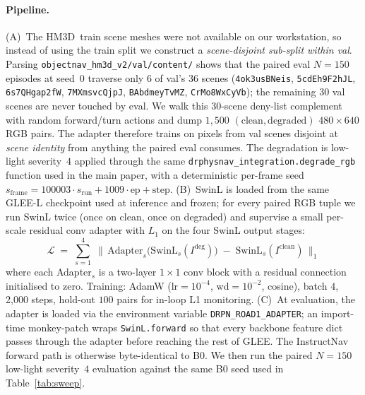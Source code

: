 \paragraph{Pipeline.} (A)~The HM3D~train scene meshes were not available
on our workstation, so instead of using the train split we construct a
\emph{scene-disjoint sub-split within val}. Parsing
\texttt{objectnav\_hm3d\_v2/val/content/} shows that the paired eval
$N{=}150$ episodes at seed~$0$ traverse only $6$ of val's $36$ scenes
(\texttt{4ok3usBNeis}, \texttt{5cdEh9F2hJL}, \texttt{6s7QHgap2fW},
\texttt{7MXmsvcQjpJ}, \texttt{BAbdmeyTvMZ}, \texttt{CrMo8WxCyVb}); the
remaining $30$ val scenes are never touched by eval. We walk this
$30$-scene deny-list complement with random forward/turn actions and dump
$1{,}500$ $(\text{clean}, \text{degraded})$ $480{\times}640$ RGB pairs.
The adapter therefore trains on pixels from val scenes disjoint at
\emph{scene identity} from anything the paired eval consumes. The
degradation is low-light severity~$4$ applied through the same
\texttt{drphysnav\_integration.degrade\_rgb} function used in the main
paper, with a deterministic per-frame seed
$s_{\text{frame}}=100003\!\cdot\!s_{\text{run}} + 1009\!\cdot\!\text{ep} + \text{step}$. (B)~SwinL is loaded from the same GLEE-L
checkpoint used at inference and frozen; for every paired RGB tuple we run
SwinL twice (once on clean, once on degraded) and supervise a small
per-scale residual conv adapter with $L_1$ on the four SwinL output stages:
\[
\mathcal{L} \;=\; \sum_{s=1}^{4}\;
\bigl\lVert\,\text{Adapter}_{s}\bigl(\text{SwinL}_{s}(I^{\text{deg}})\bigr)
       \;-\; \text{SwinL}_{s}(I^{\text{clean}})\,\bigr\rVert_1
\]
where each Adapter$_s$ is a two-layer $1{\times}1$ conv block with a
residual connection initialised to zero. Training: AdamW (lr$=10^{-4}$,
wd$=10^{-2}$, cosine), batch $4$, 2{,}000 steps, hold-out $100$ pairs for
in-loop L1 monitoring. (C)~At evaluation, the adapter is loaded via the
environment variable \texttt{DRPN\_ROAD1\_ADAPTER}; an import-time
monkey-patch wraps \texttt{SwinL.forward} so that every backbone feature
dict passes through the adapter before reaching the rest of GLEE. The
InstructNav forward path is otherwise byte-identical to B0. We then run
the paired $N{=}150$ low-light severity~$4$ evaluation against the same B0
seed used in Table~\ref{tab:sweep}.

